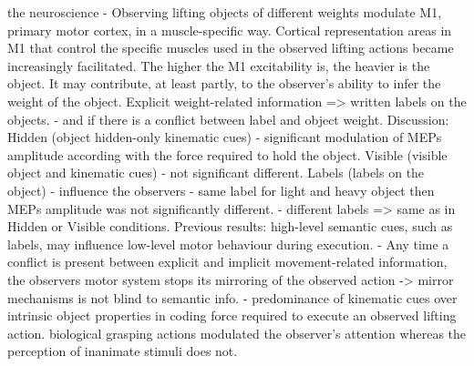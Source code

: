 the neuroscience - 
\cite{alaerts_force_2010} Observing lifting objects of different weights modulate M1, primary motor cortex, in a muscle-specific way. Cortical representation areas in M1 that control the specific muscles used in the observed lifting actions became increasingly facilitated. The higher the M1 excitability is, the heavier is the object. It may contribute, at least partly, to the observer's ability to infer the weight of the object. 
 \cite{senot_effect_2011}
Explicit weight-related information => written labels on the objects. - and if there is a conflict between label and object weight. 
Discussion: Hidden (object hidden-only kinematic cues) - significant modulation of MEPs amplitude according with the force required to hold the object. Visible (visible object and kinematic cues) - not significant different. Labels (labels on the object) - influence the observers - same label for light and heavy object then MEPs amplitude was not significantly different. - different labels => same as in Hidden or Visible conditions. 
Previous results: high-level semantic cues, such as labels, may influence low-level motor behaviour during execution. - Any time a conflict is present between explicit and implicit movement-related information, the observers motor system stops its mirroring of the observed action -> mirror mechanisms is not blind to semantic info. - predominance of kinematic cues over intrinsic object properties in coding force required to execute an observed lifting action. 
\cite{lindemann_grasping_2011} biological grasping actions modulated the observer's attention whereas the perception of inanimate stimuli does not.


